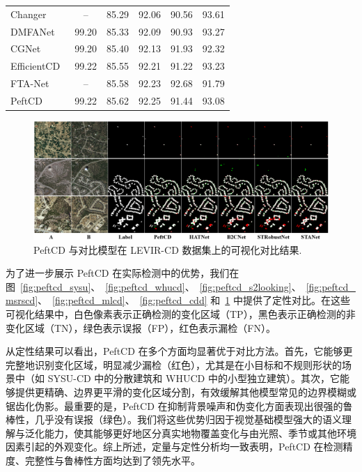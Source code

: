 \begin{table}[!htb]
\begin{tabular}{l c c c c c}
    Changer~\cite{Fang2022ChangerFI}        &   --   &  85.29 &  92.06 &  90.56 &  93.61  \\
    DMFANet~\cite{Zhan2025DifferenceAwareMF}         &  99.20 &  85.33 &  92.09 &  90.93 &  93.27  \\
    CGNet~\cite{han_change_2023}            &  99.20 &  85.40 &  92.13 &  91.93 &  92.32  \\
    EfficientCD~\cite{dong_efficientcd_2024} &  99.22 &  85.55 &  92.21 &  91.22 &  93.23  \\
    FTA-Net~\cite{t_zhu_fta-net_2025}   & -- & 85.58 & 92.23 & 92.68 & 91.79 \\
\midrule
PeftCD  & 99.22 & 85.62 & 92.25 & 91.44 & 93.08 \\
\bottomrule
\end{tabular}
\end{table}

\begin{figure}[!htb]
  \centering
  \includegraphics[width=\textwidth]{paper_figures/基于AI基础模型微调的变化检测模型研究/PeftCD/peftcd_levir.png}
  \caption{PeftCD 与对比模型在 LEVIR-CD 数据集上的可视化对比结果.}
  \label{fig:peftcd_levir}
\end{figure}


为了进一步展示 PeftCD 在实际检测中的优势，我们在图~\ref{fig:peftcd_sysu}、~\ref{fig:peftcd_whucd}、~\ref{fig:peftcd_s2looking}、~\ref{fig:peftcd_msrscd}、~\ref{fig:peftcd_mlcd}、~\ref{fig:peftcd_cdd} 和~\ref{fig:peftcd_levir} 中提供了定性对比。在这些可视化结果中，白色像素表示正确检测的变化区域（TP），黑色表示正确检测的非变化区域（TN），绿色表示误报（FP），红色表示漏检（FN）。  

从定性结果可以看出，PeftCD 在多个方面均显著优于对比方法。首先，它能够更完整地识别变化区域，明显减少漏检（红色），尤其是在小目标和不规则形状的场景中（如 SYSU-CD 中的分散建筑和 WHUCD 中的小型独立建筑）。其次，它能够提供更精确、边界更平滑的变化区域分割，有效缓解其他模型常见的边界模糊或锯齿化伪影。最重要的是，PeftCD 在抑制背景噪声和伪变化方面表现出很强的鲁棒性，几乎没有误报（绿色）。我们将这些优势归因于视觉基础模型强大的语义理解与泛化能力，使其能够更好地区分真实地物覆盖变化与由光照、季节或其他环境因素引起的外观变化。综上所述，定量与定性分析均一致表明，PeftCD 在检测精度、完整性与鲁棒性方面均达到了领先水平。  


